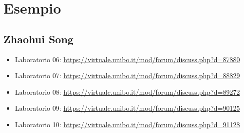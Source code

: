 \documentclass[a4paper,12pt]{report}
\begin{document}
\section*{Esempio}

\subsection{Zhaohui Song}

\begin{itemize}
 \item Laboratorio 06: \url{https://virtuale.unibo.it/mod/forum/discuss.php?d=87880}
 \item Laboratorio 07: \url{https://virtuale.unibo.it/mod/forum/discuss.php?d=88829}
 \item Laboratorio 08: \url{https://virtuale.unibo.it/mod/forum/discuss.php?d=89272}
 \item Laboratorio 09: \url{https://virtuale.unibo.it/mod/forum/discuss.php?d=90125}
 \item Laboratorio 10: \url{https://virtuale.unibo.it/mod/forum/discuss.php?d=91128}

\end{itemize}




\end{document}
